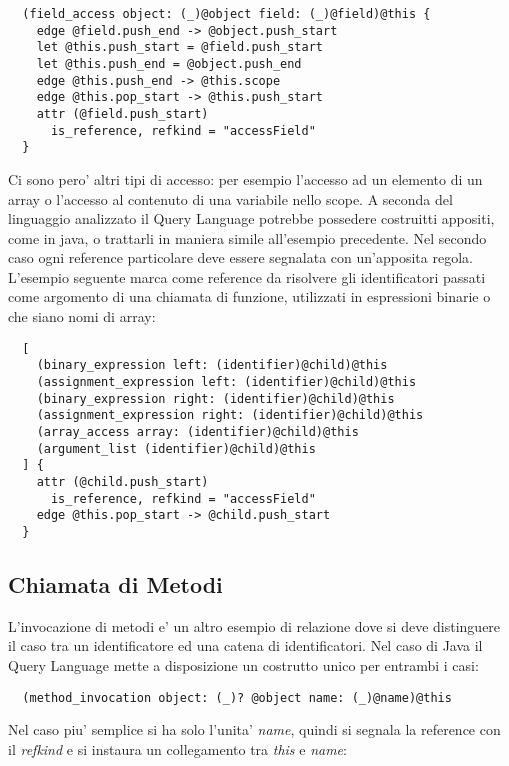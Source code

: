 \begin{lstlisting}
  (field_access object: (_)@object field: (_)@field)@this {
    edge @field.push_end -> @object.push_start
    let @this.push_start = @field.push_start
    let @this.push_end = @object.push_end
    edge @this.push_end -> @this.scope
    edge @this.pop_start -> @this.push_start
    attr (@field.push_start)
      is_reference, refkind = "accessField"
  }
\end{lstlisting}

Ci sono pero' altri tipi di accesso: per esempio l'accesso ad un elemento di un array o l'accesso al contenuto di una variabile nello scope. A seconda del linguaggio analizzato il Query Language potrebbe possedere costruitti appositi, come in java, o trattarli in maniera simile all'esempio precedente.
Nel secondo caso ogni reference particolare deve essere segnalata con un'apposita regola.
L'esempio seguente marca come reference da risolvere gli identificatori passati come argomento di una chiamata di funzione, utilizzati in espressioni binarie o che siano nomi di array:

\begin{lstlisting}
  [
    (binary_expression left: (identifier)@child)@this
    (assignment_expression left: (identifier)@child)@this
    (binary_expression right: (identifier)@child)@this
    (assignment_expression right: (identifier)@child)@this
    (array_access array: (identifier)@child)@this
    (argument_list (identifier)@child)@this
  ] {
    attr (@child.push_start)
      is_reference, refkind = "accessField"
    edge @this.pop_start -> @child.push_start
  }
\end{lstlisting}

\subsection{Chiamata di Metodi}

L'invocazione di metodi e' un altro esempio di relazione dove si deve distinguere il caso tra un identificatore ed una catena di identificatori. Nel caso di Java il Query Language mette a disposizione un costrutto unico per entrambi i casi:

\begin{lstlisting}
  (method_invocation object: (_)? @object name: (_)@name)@this
\end{lstlisting}

Nel caso piu' semplice si ha solo l'unita' \emph{name}, quindi si segnala la reference con il \emph{refkind} e si instaura un collegamento tra \emph{this} e \emph{name}:

